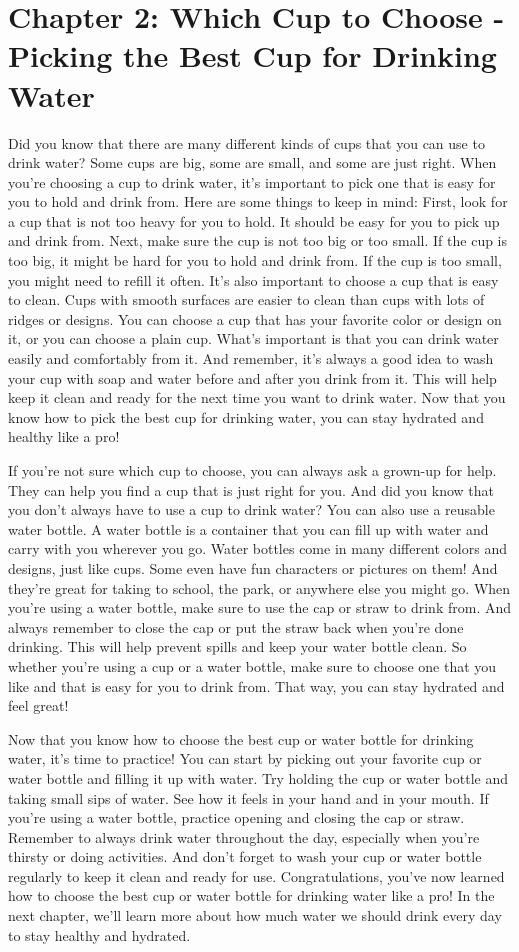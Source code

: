 \chapter{Chapter 2: Which Cup to Choose - Picking the Best Cup for Drinking Water
}

Did you know that there are many different kinds of
cups that you can use to drink water? Some cups are big, some are small, and
some are just right.
When you're choosing a cup to drink water, it's
important to pick one that is easy for you to hold and drink from. Here are
some things to keep in mind:
First, look for a cup that is not too heavy for you to
hold. It should be easy for you to pick up and drink from.
Next, make sure the cup is not too big or too small.
If the cup is too big, it might be hard for you to hold and drink from. If the
cup is too small, you might need to refill it often.
It's also important to choose a cup that is easy to
clean. Cups with smooth surfaces are easier to clean than cups with lots of
ridges or designs.
You can choose a cup that has your favorite color or
design on it, or you can choose a plain cup. What's important is that you can
drink water easily and comfortably from it.
And remember, it's always a good idea to wash your cup
with soap and water before and after you drink from it. This will help keep it
clean and ready for the next time you want to drink water.
Now that you know how to pick the best cup for
drinking water, you can stay hydrated and healthy like a pro!
 
If you're not sure which cup to choose, you can always ask a grown-up for help. They can help you find a cup that is just right for you.
And did you know that you don't always have to use a
cup to drink water? You can also use a reusable water bottle. A water bottle is
a container that you can fill up with water and carry with you wherever you go.
Water bottles come in many different colors and
designs, just like cups. Some even have fun characters or pictures on them! And
they're great for taking to school, the park, or anywhere else you might go.
When you're using a water bottle, make sure to use the
cap or straw to drink from. And always remember to close the cap or put the
straw back when you're done drinking. This will help prevent spills and keep
your water bottle clean.
So whether you're using a cup or a water bottle, make
sure to choose one that you like and that is easy for you to drink from. That way, you can stay
hydrated and feel great!
 
Now that you know how to choose the best cup or water bottle for drinking water, it's time to practice! You can start by picking out your favorite cup or water bottle and filling it up with water.
Try holding the cup or water bottle and taking small
sips of water. See how it feels in your hand and in your mouth. If you're using
a water bottle, practice opening and closing the cap or straw.
Remember to always drink water throughout the day,
especially when you're thirsty or doing activities. And don't forget to wash
your cup or water bottle regularly to keep it clean and ready for use.
Congratulations, you've now learned how to choose the
best cup or water bottle for drinking water like a pro! In the next chapter,
we'll learn more about how much water we should drink every day to stay healthy
and hydrated.
